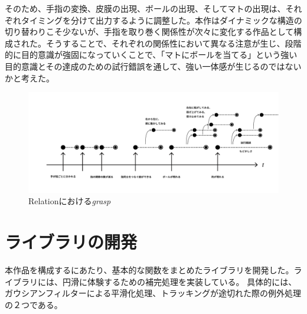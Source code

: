 そのため、手指の変換、皮膜の出現、ボールの出現、そしてマトの出現は、それぞれタイミングを分けて出力するように調整した。本作はダイナミックな構造の切り替わりこそ少ないが、手指を取り巻く関係性が次々に変化する作品として構成された。そうすることで、それぞれの関係性において異なる注意が生じ、段階的に目的意識が強固になっていくことで、「マトにボールを当てる」という強い目的意識とその達成のための試行錯誤を通して、強い一体感が生じるのではないかと考えた。

\begin{figure}[H]
  \centering
  \includegraphics[width=15cm]{img/grasp_relation.png}
  \caption{Relationにおける\textit{grasp}}
  \label{fig:grasp_relation}
\end{figure}




\section{ライブラリの開発}
本作品を構成するにあたり、基本的な関数をまとめたライブラリを開発した。ライブラリには、円滑に体験するための補完処理を実装している。
具体的には、ガウシアンフィルターによる平滑化処理、トラッキングが途切れた際の例外処理の２つである。

